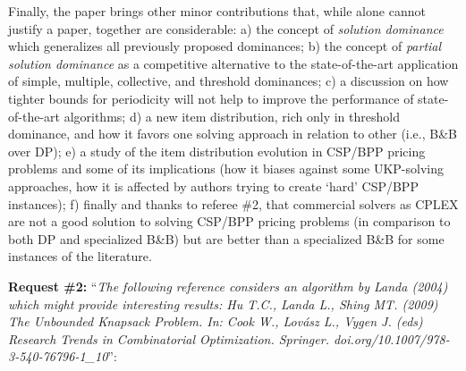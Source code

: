 \documentclass{elsarticle}
\begin{document}
Finally, the paper brings other minor contributions that, while alone cannot justify a paper, together are considerable:
a) the concept of \emph{solution dominance} which generalizes all previously proposed dominances; 
b) the concept of \emph{partial solution dominance} as a competitive alternative to the state-of-the-art application of simple, multiple, collective, and threshold dominances;
c) a discussion on how tighter bounds for periodicity will not help to improve the performance of state-of-the-art algorithms;
d) a new item distribution, rich only in threshold dominance, and how it favors one solving approach in relation to other (i.e., B\&B over DP);
e) a study of the item distribution evolution in CSP/BPP pricing problems and some of its implications (how it biases against some UKP-solving approaches, how it is affected by authors trying to create `hard' CSP/BPP instances);
f) finally and thanks to referee \#2, that commercial solvers as CPLEX are not a good solution to solving CSP/BPP pricing problems (in comparison to both DP and specialized B\&B) but are better than a specialized B\&B for some instances of the literature.
\medskip

\textbf{Request \#2:} ``\textit{The following reference considers an algorithm by Landa (2004) which might provide interesting results: Hu T.C., Landa L., Shing MT. (2009) The Unbounded Knapsack Problem. In: Cook W., Lovász L., Vygen J. (eds) Research Trends in Combinatorial Optimization. Springer. doi.org/10.1007/978-3-540-76796-1\_10}'':
\end{document}
